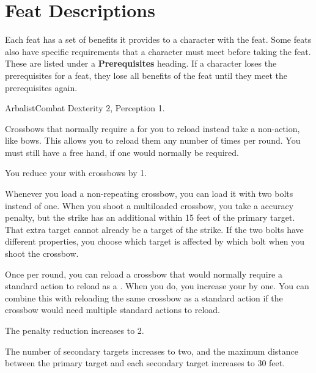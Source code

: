 \section{Feat Descriptions}
  Each feat has a set of benefits it provides to a character with the feat.
  Some feats also have specific requirements that a character must meet before taking the feat.
  These are listed under a \textbf{Prerequisites} heading.
  If a character loses the prerequisites for a feat, they lose all benefits of the feat until they meet the prerequisites again.

  \begin{feat}{Arbalist}{Combat}
    \featpre Dexterity 2, Perception 1.

     Crossbows that normally require a  for you to reload instead take a non-action, like bows.
    This allows you to reload them any number of times per round.
    You must still have a free hand, if one would normally be required.

     You reduce your  with crossbows by 1.

     Whenever you load a non-repeating crossbow, you can load it with two bolts instead of one.
    When you shoot a multiloaded crossbow, you take a  accuracy penalty, but the strike has an additional  within 15 feet of the primary target.
    That extra target cannot already be a target of the strike.
    If the two bolts have different properties, you choose which target is affected by which bolt when you shoot the crossbow.

     Once per round, you can reload a crossbow that would normally require a standard action to reload as a .
    When you do, you increase your  by one.
    You can combine this with reloading the same crossbow as a standard action if the crossbow would need multiple standard actions to reload.

     The penalty reduction increases to 2.

     The number of secondary targets increases to two, and the maximum distance between the primary target and each secondary target increases to 30 feet.
  \end{feat}

